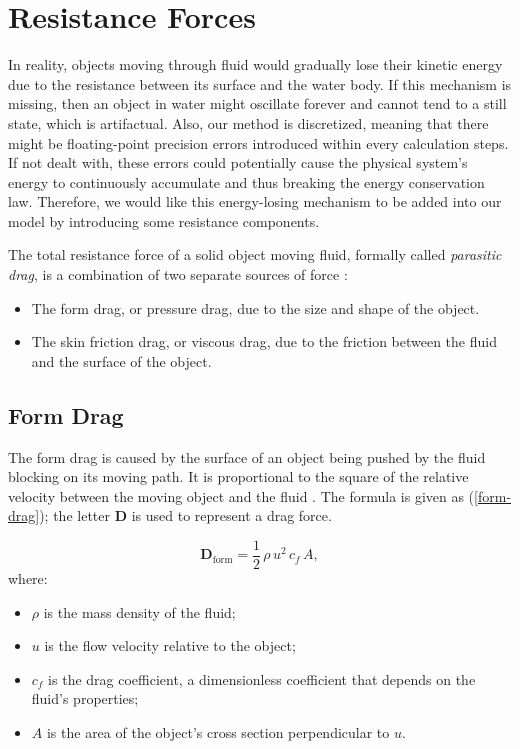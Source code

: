 \section{Resistance Forces}

In reality, objects moving through fluid would gradually lose their kinetic energy due to the resistance between its surface and the water body.
If this mechanism is missing, then an object in water might oscillate forever and cannot tend to a still state, which is artifactual.
Also, our method is discretized, meaning that there might be floating-point precision errors introduced within every calculation steps.
If not dealt with, these errors could potentially cause the physical system's energy to continuously accumulate and thus breaking the energy conservation law.
Therefore, we would like this energy-losing mechanism to be added into our model by introducing some resistance components.

The total resistance force of a solid object moving fluid, formally called \emph{parasitic drag}, is a combination of two separate sources of force \cite{wadell1934coefficient}:
\begin{itemize}
	\item The form drag, or pressure drag, due to the size and shape of the object.
	\item The skin friction drag, or viscous drag, due to the friction between the fluid and the surface of the object.
\end{itemize}

\subsection{Form Drag}

The form drag is caused by the surface of an object being pushed by the fluid blocking on its moving path.
It is proportional to the square of the relative velocity between the moving object and the fluid \cite{flemmer1986drag}.
The formula is given as (\ref{form-drag}); the letter $\mathbf{D}$ is used to represent a drag force.

\begin{equation}
	\mathbf{D}_{\text{form}}=\frac{1}{2}\,\rho\,u^2\,c_f\,A,
	\label{form-drag}
\end{equation}
where:
\begin{itemize}
	\item $\rho$ is the mass density of the fluid;
	\item $u$ is the flow velocity relative to the object;
	\item $c_f$ is the drag coefficient, a dimensionless coefficient that depends on the fluid's properties;
	\item $A$ is the area of the object's cross section perpendicular to $u$.
\end{itemize}

